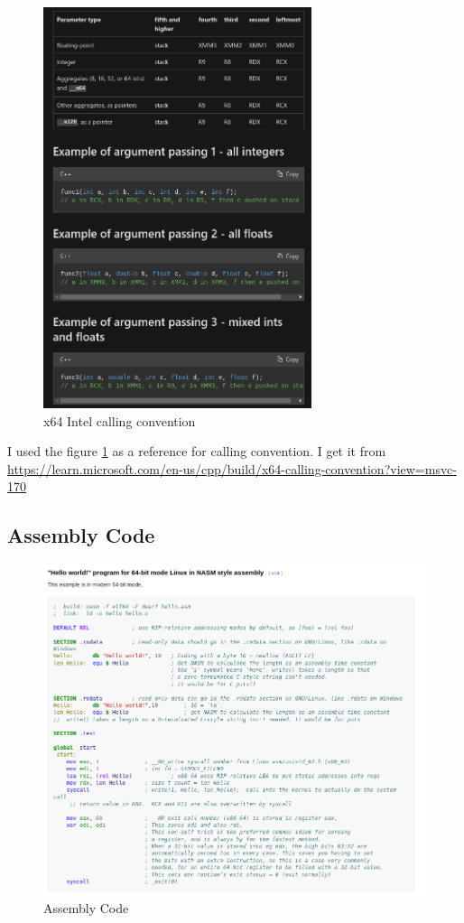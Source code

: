 \documentclass{article}
\begin{document}
\begin{figure}[H]
    \centering
    \includegraphics[width=0.7\textwidth]{calling_convention.png}
    \caption{x64 Intel calling convention}
    \label{fig:calling_convention}
\end{figure}

I used the figure \ref{fig:calling_convention} as a reference for calling convention. I get it from \url{https://learn.microsoft.com/en-us/cpp/build/x64-calling-convention?view=msvc-170}

\subsection{Assembly Code}

\begin{figure}[H]
    \centering
    \includegraphics[width=\textwidth]{assembly_code.png}
    \caption{Assembly Code}
    \label{fig:assembly_code}
\end{figure}
\end{document}
